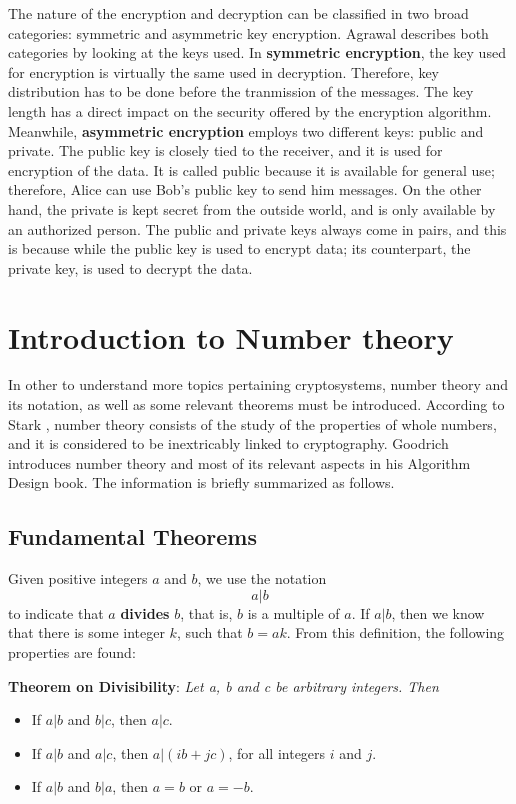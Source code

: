 The nature of the encryption and decryption can be classified in two broad categories: symmetric and asymmetric key encryption. Agrawal \cite{CryptoKeys} describes both categories by looking at the keys used. In \textbf{symmetric encryption}, the key used for encryption is virtually the same used in decryption. Therefore, key distribution has to be done before the tranmission of the messages. The key length has a direct impact on the security offered by the encryption algorithm. Meanwhile, \textbf{asymmetric encryption} employs two different keys: public and private. The public key is closely tied to the receiver, and it is used for encryption of the data. It is called public because it is available for general use; therefore, Alice can use Bob's public key to send him messages. On the other hand, the private is kept secret from the outside world, and is only available by an authorized person. The public and private keys always come in pairs, and this is because while the public key is used to encrypt data; its counterpart, the private key, is used to decrypt the data. 

\section{Introduction to Number theory}

In other to understand more topics pertaining cryptosystems, number theory and its notation, as well as some relevant theorems must be introduced. According to Stark \cite{stark1970introduction}, number theory consists of the study of the properties of whole numbers, and it is considered to be inextricably linked to cryptography. Goodrich introduces number theory and most of its relevant aspects in his Algorithm Design \cite{2008algorithm} book. The information is briefly summarized as follows.

\subsection{Fundamental Theorems}

Given positive integers $a$ and $b$, we use the notation 
\[
a|b
\]
to indicate that $a$ \textbf{divides} $b$, that is, $b$ is a multiple of $a$. If $a|b$, then we know that there is some integer $k$, such that $b=ak$. From this definition, the following properties are found:

\textbf{Theorem on Divisibility}: \textit{Let a, b and c be arbitrary integers. Then}
\begin{itemize}
\item If $a|b$ and $b|c$, then $a|c$.
\item If $a|b$ and $a|c$, then $a|(ib+jc)$, for all integers $i$ and $j$.
\item If $a|b$ and $b|a$, then $a=b$ or $a= -b$.
\end{itemize}

